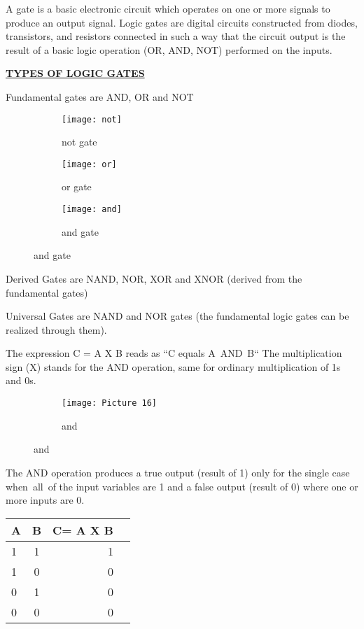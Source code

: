 \documentclass{article}
\begin{document}
A gate is a basic electronic circuit which operates on one or more signals to produce an output signal. 
Logic gates are digital circuits constructed from diodes, transistors, and resistors connected in such a way that the circuit output is the result of a basic logic operation (OR, AND, NOT) performed on the inputs.

\textbf{\underline{TYPES OF LOGIC GATES}}

Fundamental gates are AND, OR and NOT

\begin{figure}[h!]
	\centering
	\begin{subfigure}[b]{0.2\linewidth}
		
		\texttt{[image: not]}
		\caption{not gate}\end{subfigure}
	\begin{subfigure}[b]{0.2\linewidth}
		\texttt{[image: or]}
		\caption{or gate}
	\end{subfigure}
	\begin{subfigure}[b]{0.2\linewidth}
		\texttt{[image: and]}
		\caption{and gate}
	\end{subfigure}
\end{figure}
Derived Gates are NAND, NOR, XOR and XNOR (derived from the fundamental gates)

Universal Gates are NAND and NOR gates (the fundamental logic gates can be realized through them).

The expression C = A X B reads as “C equals A AND B“ 
The multiplication sign (X) stands for the AND operation, same for ordinary multiplication of 1s and 0s.


\begin{figure}[h!]
	\centering
	\begin{subfigure}[b]{0.2\linewidth}
		
		\texttt{[image: Picture 16]}
		\caption{and}
	\end{subfigure}
	\end{figure}
The AND operation produces a true output (result of 1) only for the single case when all of the input variables are 1 and a false output (result of 0) where one or more inputs are 0.

\begin{table}[h!]
	\begin{center}
		\begin{tabular}{l|S|r|c|} %
			\hline
			\textbf{A} & \textbf{B} & \textbf{C= A X B}\\
			\hline
			1 & 1 & 1\\
			1 & 0 & 0\\
			0 & 1 & 0 \\
			0 & 0 & 0 \\
		\hline
		
	\end{tabular}
\end{center}
\end{table}
\end{document}
